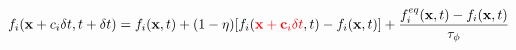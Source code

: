 \documentclass[10pt]{article}
\begin{document}
\begin{align*}f_i(\bold{x}+c_i \delta t,t+\delta t)
= f_i(\bold{x},t)+(1-\eta)[f_i({\color[rgb]{1.000000,0.000000,0.000000}\bold{x}+\bold{c}_i\delta t},t)-f_i(\bold{x},t)]+
\frac{f_i^{eq}(\bold{x},t)-f_i(\bold{x},t)}{\tau_\phi}

\end{align*}
\end{document}
